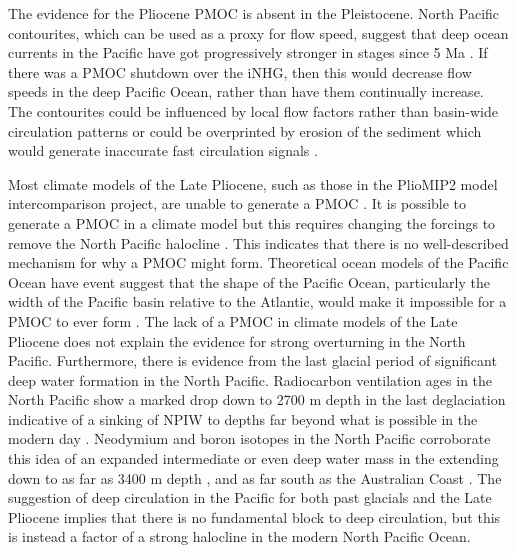 The evidence for the Pliocene PMOC is absent in the Pleistocene. North Pacific contourites, which can be used as a proxy for flow speed, suggest that deep ocean currents in the Pacific have got progressively stronger in stages since 5 Ma \citep{yinProgressiveIntensificationPacific2022}. If there was a PMOC shutdown over the iNHG, then this would decrease flow speeds in the deep Pacific Ocean, rather than have them continually increase. The contourites could be influenced by local flow factors rather than basin-wide circulation patterns or could be overprinted by erosion of the sediment which would generate inaccurate fast circulation signals \citep{stowChapterNatureContourite2008}.

Most climate models of the Late Pliocene, such as those in the PlioMIP2 model intercomparison project, are unable to generate a PMOC \citep{zhangMidPlioceneAtlanticMeridional2021,haywoodPlioceneModelIntercomparison2020}. It is possible to generate a PMOC in a climate model but this requires changing the forcings to remove the North Pacific halocline \citep{burlsSimulatingPlioceneWarmth2014, burlsActivePacificMeridional2017, menvielRemovingNorthPacific2012}. This indicates that there is no well-described mechanism for why a PMOC might form. Theoretical ocean models of the Pacific Ocean have event suggest that the shape of the Pacific Ocean, particularly the width of the Pacific basin relative to the Atlantic, would make it impossible for a PMOC to ever form \citep{jonesSizeMattersAnother2017,jonesInterbasinTransportMeridional2016}. The lack of a PMOC in climate models of the Late Pliocene does not explain the evidence for strong overturning in the North Pacific. Furthermore, there is evidence from the last glacial period of significant deep water formation in the North Pacific. Radiocarbon ventilation ages in the North Pacific show a marked drop down to 2700 m depth in the last deglaciation indicative of a sinking of NPIW to depths far beyond what is possible in the modern day \citep{okazakiDeepwaterFormationNorth2010}. Neodymium and boron isotopes in the North Pacific corroborate this idea of an expanded intermediate or even deep water mass in the extending down to as far as 3400 m depth \citep{raeDeepWaterFormation2014}, and as far south as the Australian Coast \citep{struveDeepTasmanOutflow2022}. The suggestion of deep circulation in the Pacific for both past glacials and the Late Pliocene implies that there is no fundamental block to deep circulation, but this is instead a factor of a strong halocline in the modern North Pacific Ocean.

